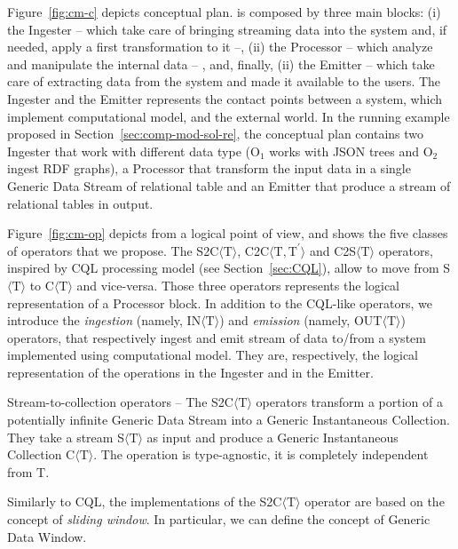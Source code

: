 {Figure~\ref{fig:cm-c} depicts \river{} conceptual plan.
\river{} is composed by three main blocks: (i) the \textsf{Ingester} -- which take care of bringing streaming data into the system and, if needed, apply a first transformation to it --, (ii) the \textsf{Processor} -- which analyze and manipulate the internal data -- , and, finally, (ii) the \textsf{Emitter} -- which take care of extracting data from the system and made it available to the users.
The \textsf{Ingester} and the \textsf{Emitter} represents the contact points between a system, which implement \river{} computational model, and the external world.
In the running example proposed in Section~\ref{sec:comp-mod-sol-re}, the conceptual plan contains two \textsf{Ingester} that work with different data type (O$_1$ works with JSON trees and O$_2$ ingest RDF graphs), a \textsf{Processor} that transform the input data in a single Generic Data Stream of relational table and an \textsf{Emitter} that produce a stream of relational tables in output.

Figure~\ref{fig:cm-op} depicts \river{} from a logical point of view, and shows the five classes of operators that we propose. 
The S2C$\langle\mathrm{T}\rangle$, C2C$\langle\mathrm{T},\mathrm{T^{\prime}}\rangle$ and C2S$\langle\mathrm{T}\rangle$ operators, inspired by CQL processing model (see Section~\ref{sec:CQL}), allow to move from S$\langle\mathrm{T}\rangle$ to C$\langle\mathrm{T}\rangle$ and vice-versa. Those three operators represents the logical representation of a \textsf{Processor} block.
In addition to the CQL-like operators, we introduce the \textit{ingestion} (namely, IN$\langle\mathrm{T}\rangle$) and \textit{emission} (namely, OUT$\langle\mathrm{T}\rangle$) operators, that respectively ingest and emit stream of data to/from a system implemented using \river{} computational model. They are, respectively, the logical representation of the operations in the \textsf{Ingester} and in the \textsf{Emitter}.

\textsf{Stream-to-collection operators} -- The S2C$\langle\mathrm{T}\rangle$ operators transform a portion of a potentially infinite Generic Data Stream into a Generic Instantaneous Collection. They take a stream S$\langle\mathrm{T}\rangle$ as input and produce a Generic Instantaneous Collection C$\langle\mathrm{T}\rangle$. The operation is type-agnostic, it is completely independent from $\mathrm{T}$.

Similarly to CQL, the implementations of the S2C$\langle\mathrm{T}\rangle$ operator are based on the concept of \textit{sliding window}.
In particular, we can define the concept of Generic Data Window.

}
